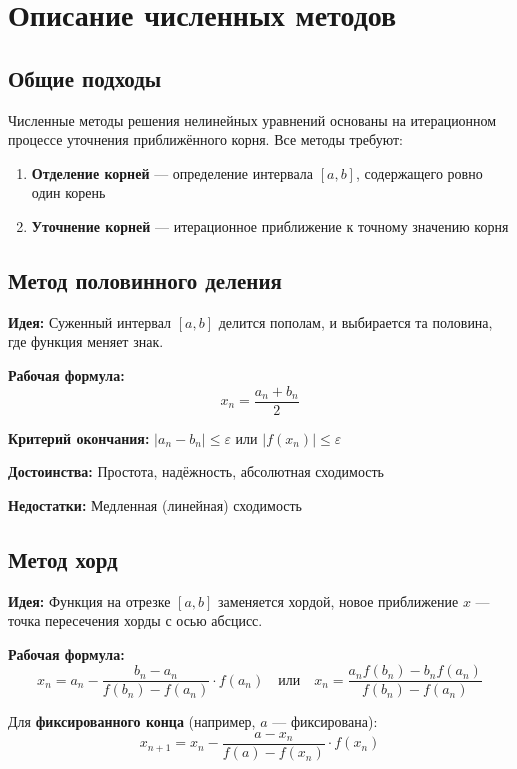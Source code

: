 \documentclass[a4paper,12pt]{article}
\begin{document}
\newpage

\section{Описание численных методов}

\subsection{Общие подходы}

Численные методы решения нелинейных уравнений основаны на итерационном процессе уточнения приближённого корня. Все методы требуют:
\begin{enumerate}
    \item \textbf{Отделение корней} --- определение интервала $[a,b]$, содержащего ровно один корень
    \item \textbf{Уточнение корней} --- итерационное приближение к точному значению корня
\end{enumerate}

\subsection{Метод половинного деления}

\textbf{Идея:} Суженный интервал $[a, b]$ делится пополам, и выбирается та половина, где функция меняет знак.

\textbf{Рабочая формула:}
\[
    x_n = \frac{a_n + b_n}{2}
\]

\textbf{Критерий окончания:} $|a_n - b_n| \leq \varepsilon$ или $|f(x_n)| \leq \varepsilon$

\textbf{Достоинства:} Простота, надёжность, абсолютная сходимость

\textbf{Недостатки:} Медленная (линейная) сходимость

\subsection{Метод хорд}

\textbf{Идея:} Функция на отрезке $[a, b]$ заменяется хордой, новое приближение $x$ --- точка пересечения хорды с осью абсцисс.

\textbf{Рабочая формула:}
\[
    x_n = a_n - \frac{b_n - a_n}{f(b_n) - f(a_n)} \cdot f(a_n)
    \quad \text{или} \quad
    x_n = \frac{a_n f(b_n) - b_n f(a_n)}{f(b_n) - f(a_n)}
\]

Для \textbf{фиксированного конца} (например, $a$ --- фиксирована):
\[
    x_{n+1} = x_n - \frac{a - x_n}{f(a) - f(x_n)} \cdot f(x_n)
\]
\end{document}
